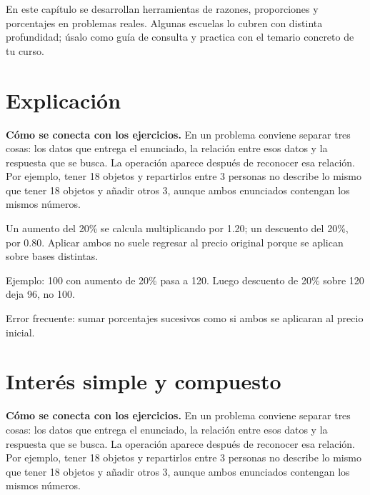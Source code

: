 \documentclass[10pt,oneside,openany]{book}
\begin{document}
\begin{idea}
En este capítulo se desarrollan herramientas de razones, proporciones y porcentajes en problemas reales. Algunas escuelas lo cubren con distinta profundidad; úsalo como guía de consulta y practica con el temario concreto de tu curso.
\end{idea}

\section{Explicación}

\textbf{Cómo se conecta con los ejercicios.} En un problema conviene separar tres cosas: los datos que entrega el enunciado, la relación entre esos datos y la respuesta que se busca. La operación aparece después de reconocer esa relación. Por ejemplo, tener 18 objetos y repartirlos entre 3 personas no describe lo mismo que tener 18 objetos y añadir otros 3, aunque ambos enunciados contengan los mismos números.

Un aumento del 20\% se calcula multiplicando por 1.20; un descuento del 20\%, por 0.80. Aplicar ambos no suele regresar al precio original porque se aplican sobre bases distintas.



\begin{ejemplo}
Ejemplo: \textdollar{}100 con aumento de 20\% pasa a \textdollar{}120. Luego descuento de 20\% sobre \textdollar{}120 deja \textdollar{}96, no \textdollar{}100.
\end{ejemplo}

\begin{ojo}
Error frecuente: sumar porcentajes sucesivos como si ambos se aplicaran al precio inicial.
\end{ojo}



\section{Interés simple y compuesto}

\textbf{Cómo se conecta con los ejercicios.} En un problema conviene separar tres cosas: los datos que entrega el enunciado, la relación entre esos datos y la respuesta que se busca. La operación aparece después de reconocer esa relación. Por ejemplo, tener 18 objetos y repartirlos entre 3 personas no describe lo mismo que tener 18 objetos y añadir otros 3, aunque ambos enunciados contengan los mismos números.
\end{document}
